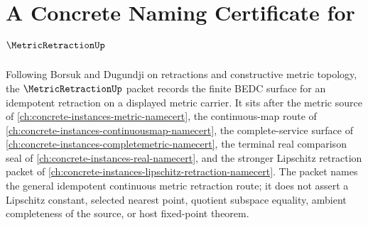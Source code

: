 \chapter{A Concrete Naming Certificate for $\MetricRetractionUp$}
\label{ch:concrete-instances-metric-retraction-namecert}

Following Borsuk and Dugundji on retractions and constructive metric topology, the $\MetricRetractionUp$ packet records the finite BEDC surface for an idempotent retraction on a displayed metric carrier. It sits after the metric source of \autoref{ch:concrete-instances-metric-namecert}, the continuous-map route of \autoref{ch:concrete-instances-continuousmap-namecert}, the complete-service surface of \autoref{ch:concrete-instances-completemetric-namecert}, the terminal real comparison seal of \autoref{ch:concrete-instances-real-namecert}, and the stronger Lipschitz retraction packet of \autoref{ch:concrete-instances-lipschitz-retraction-namecert}. The packet names the general idempotent continuous metric retraction route; it does not assert a Lipschitz constant, selected nearest point, quotient subspace equality, ambient completeness of the source, or host fixed-point theorem.

